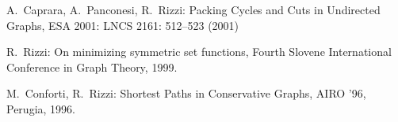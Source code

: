 \begin{etaremune}
\vspace{-1.8mm}
  \item {A.~Caprara, A.~Panconesi, R.~Rizzi:}
   \newblock  Packing Cycles and Cuts in Undirected Graphs,
   \newblock ESA 2001:
   \newblock LNCS 2161: 512--523 (2001)

\vspace{-1.8mm}
  \item {R.~Rizzi:}
   \newblock On minimizing symmetric set functions,
   \newblock Fourth Slovene International Conference
             in Graph Theory, 1999.

\vspace{-1.8mm}
  \item {M.~Conforti, R.~Rizzi:}
   \newblock Shortest Paths in Conservative Graphs,
   \newblock AIRO '96, Perugia, 1996.

\end{etaremune}
